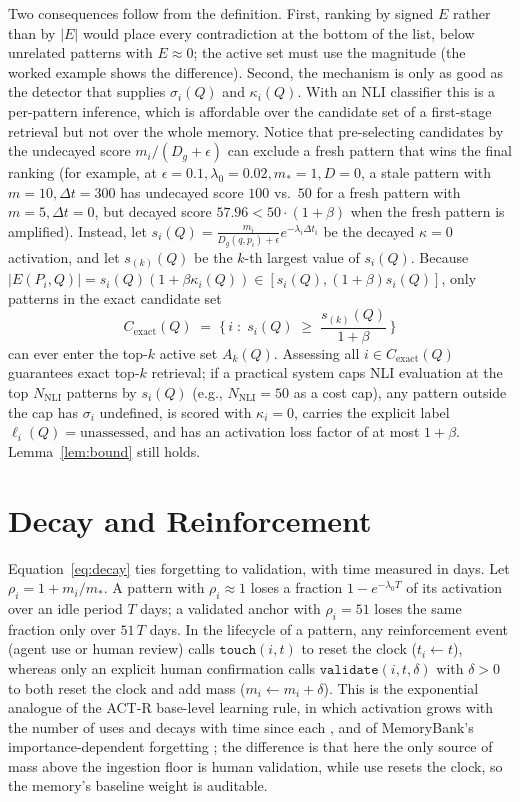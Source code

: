 \documentclass[11pt]{article}
\theoremstyle{remark}
\newcommand{\act}{E}
\newcommand{\dist}{D_g}
\begin{document}
Two consequences follow from the definition. First, ranking by signed $\act$ rather than by $|\act|$ would place every contradiction at the bottom of the list, below unrelated patterns with $\act\approx 0$; the active set must use the magnitude (the worked example shows the difference). Second, the mechanism is only as good as the detector that supplies $\sigma_i(Q)$ and $\kappa_i(Q)$. With an NLI classifier this is a per-pattern inference, which is affordable over the candidate set of a first-stage retrieval but not over the whole memory. Notice that pre-selecting candidates by the undecayed score $m_i/(\dist+\epsilon)$ can exclude a fresh pattern that wins the final ranking (for example, at $\epsilon=0.1, \lambda_0=0.02, m_\ast=1, D=0$, a stale pattern with $m=10, \Delta t=300$ has undecayed score $100$ vs.\ $50$ for a fresh pattern with $m=5, \Delta t=0$, but decayed score $57.96 < 50 \cdot (1+\beta)$ when the fresh pattern is amplified). Instead, let $s_i(Q) = \frac{m_i}{\dist(q,p_i)+\epsilon}e^{-\lambda_i\Delta t_i}$ be the decayed $\kappa=0$ activation, and let $s_{(k)}(Q)$ be the $k$-th largest value of $s_i(Q)$. Because $|\act(P_i,Q)| = s_i(Q)(1+\beta\kappa_i(Q))\in [s_i(Q), (1+\beta)s_i(Q)]$, only patterns in the exact candidate set
\begin{equation}
\label{eq:candidates}
C_{\text{exact}}(Q) \;=\; \bigl\{\, i \;:\; s_i(Q) \;\ge\; \frac{s_{(k)}(Q)}{1+\beta} \,\bigr\}
\end{equation}
can ever enter the top-$k$ active set $A_k(Q)$. Assessing all $i\in C_{\text{exact}}(Q)$ guarantees exact top-$k$ retrieval; if a practical system caps NLI evaluation at the top $N_{\text{NLI}}$ patterns by $s_i(Q)$ (e.g., $N_{\text{NLI}}=50$ as a cost cap), any pattern outside the cap has $\sigma_i$ undefined, is scored with $\kappa_i=0$, carries the explicit label $\ell_i(Q)=\text{unassessed}$, and has an activation loss factor of at most $1+\beta$. Lemma~\ref{lem:bound} still holds.

\section{Decay and Reinforcement}
\label{sec:decay}

Equation~\eqref{eq:decay} ties forgetting to validation, with time measured in days. Let $\rho_i=1+m_i/m_\ast$. A pattern with $\rho_i\approx 1$ loses a fraction $1-e^{-\lambda_0 T}$ of its activation over an idle period $T$ days; a validated anchor with $\rho_i=51$ loses the same fraction only over $51\,T$ days. In the lifecycle of a pattern, any reinforcement event (agent use or human review) calls $\texttt{touch}(i, t)$ to reset the clock ($t_i\leftarrow t$), whereas only an explicit human confirmation calls $\texttt{validate}(i, t, \delta)$ with $\delta > 0$ to both reset the clock and add mass ($m_i\leftarrow m_i+\delta$). This is the exponential analogue of the ACT-R base-level learning rule, in which activation grows with the number of uses and decays with time since each \citep{anderson1991reflections}, and of MemoryBank's importance-dependent forgetting \citep{zhong2024memorybank}; the difference is that here the only source of mass above the ingestion floor is human validation, while use resets the clock, so the memory's baseline weight is auditable.
\end{document}

